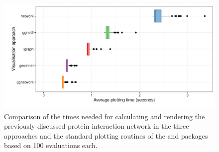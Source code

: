 \begin{figure}
\centering

\includegraphics[width=\textwidth]{figure/compare-1.pdf}
\caption{\label{fig:timings} Comparison of the times needed for calculating and rendering the previously discussed protein interaction network in the three  approaches and the standard plotting routines  of the  and  packages based on 100 evaluations each.  }
\end{figure}










